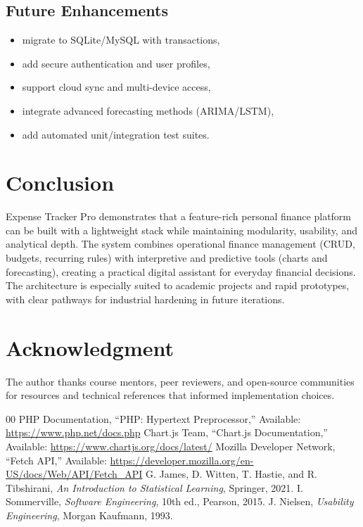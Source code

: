\documentclass[conference]{IEEEtran}
\begin{document}
\subsection{Future Enhancements}
\begin{itemize}
    \item migrate to SQLite/MySQL with transactions,
    \item add secure authentication and user profiles,
    \item support cloud sync and multi-device access,
    \item integrate advanced forecasting methods (ARIMA/LSTM),
    \item add automated unit/integration test suites.
\end{itemize}

\section{Conclusion}
Expense Tracker Pro demonstrates that a feature-rich personal finance platform can be built with a lightweight stack while maintaining modularity, usability, and analytical depth. The system combines operational finance management (CRUD, budgets, recurring rules) with interpretive and predictive tools (charts and forecasting), creating a practical digital assistant for everyday financial decisions. The architecture is especially suited to academic projects and rapid prototypes, with clear pathways for industrial hardening in future iterations.

\section*{Acknowledgment}
The author thanks course mentors, peer reviewers, and open-source communities for resources and technical references that informed implementation choices.

\begin{thebibliography}{00}
 PHP Documentation, ``PHP: Hypertext Preprocessor,'' Available: \url{https://www.php.net/docs.php}
 Chart.js Team, ``Chart.js Documentation,'' Available: \url{https://www.chartjs.org/docs/latest/}
 Mozilla Developer Network, ``Fetch API,'' Available: \url{https://developer.mozilla.org/en-US/docs/Web/API/Fetch_API}
 G. James, D. Witten, T. Hastie, and R. Tibshirani, \emph{An Introduction to Statistical Learning}, Springer, 2021.
 I. Sommerville, \emph{Software Engineering}, 10th ed., Pearson, 2015.
 J. Nielsen, \emph{Usability Engineering}, Morgan Kaufmann, 1993.
\end{thebibliography}
\end{document}

